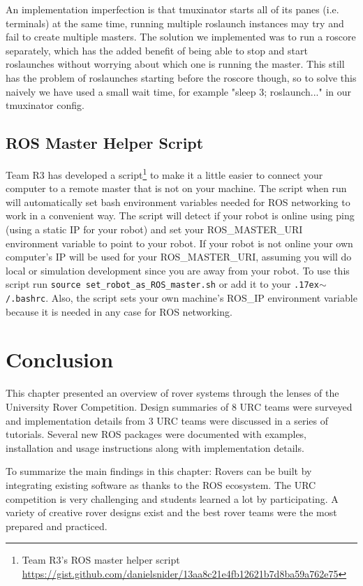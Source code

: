\documentclass[runningheads,a4paper]{llncs}
\begin{document}
An implementation imperfection is that tmuxinator starts all of its panes (i.e. terminals) at the same time, running multiple roslaunch instances may try and fail to create multiple masters. The solution we implemented was to run a roscore separately, which has the added benefit of being able to stop and start roslaunches without worrying about which one is running the master. This still has the problem of roslaunches starting before the roscore though, so to solve this naively we have used a small wait time, for example "sleep 3; roslaunch..." in our tmuxinator config.

\subsection{ROS Master Helper Script}

Team R3 has developed a script\footnote{Team R3's ROS master helper script \url{https://gist.github.com/danielsnider/13aa8c21e4fb12621b7d8ba59a762e75}} to make it a little easier to connect your computer to a remote master that is not on your machine. The script when run will automatically set bash environment variables needed for ROS networking to work in a convenient way. The script will detect if your robot is online using ping (using a static IP for your robot) and set your ROS\_MASTER\_URI environment variable to point to your robot. If your robot is not online your own computer's IP will be used for your ROS\_MASTER\_URI, assuming you will do local or simulation development since you are away from your robot. To use this script run \texttt{source set\_robot\_as\_ROS\_master.sh} or add it to your \texttt{{\raise.17ex\hbox{$\scriptstyle\sim$}}/.bashrc}. Also, the script sets your own machine's ROS\_IP environment variable because it is needed in any case for ROS networking.

\section{Conclusion}\label{conclusion}

This chapter presented an overview of rover systems through the lenses of the University Rover Competition. Design summaries of 8 URC teams were surveyed and implementation details from 3 URC teams were discussed in a series of tutorials. Several new ROS packages were documented with examples, installation and usage instructions along with implementation details.

To summarize the main findings in this chapter: Rovers can be built by integrating existing software as thanks to the ROS ecosystem. The URC competition is very challenging and students learned a lot by participating. A variety of creative rover designs exist and the best rover teams were the most prepared and practiced.
\end{document}
